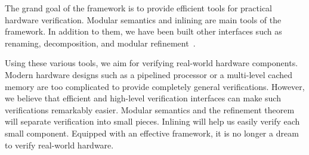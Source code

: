 The grand goal of the \Kami{} framework is to provide efficient tools
for practical hardware verification. Modular semantics and inlining
are main tools of the framework. In addition to them, we have been
built other interfaces such as renaming, decomposition, and modular
refinement~\cite{murali-thesis}.

Using these various tools, we aim for verifying real-world hardware
components. Modern hardware designs such as a pipelined processor or a
multi-level cached memory are too complicated to provide completely
general verifications. However, we believe that efficient and
high-level verification interfaces can make such verifications
remarkably easier. Modular semantics and the refinement theorem will
separate verification into small pieces. Inlining will help us easily
verify each small component. Equipped with an effective framework, it
is no longer a dream to verify real-world hardware.

